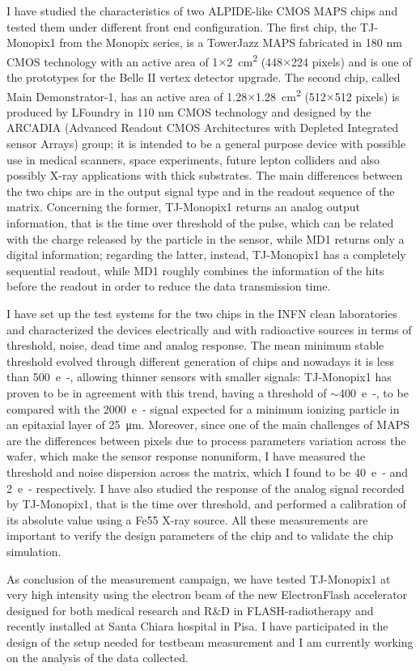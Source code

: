 I have studied the characteristics of two ALPIDE-like CMOS MAPS chips and tested them under different front end configuration. The first chip, the TJ-Monopix1 from the Monopix series, is a TowerJazz MAPS fabricated in 180 nm CMOS technology with an active area of 1$\times$2~\si{cm\squared} (448$\times$224 pixels) and is one of the prototypes for the Belle II vertex detector upgrade. The second chip, called Main Demonstrator-1, has an active area of 1.28$\times$1.28~\si{cm\squared} (512$\times$512 pixels) is produced by LFoundry in 110 nm CMOS technology and designed by the ARCADIA (Advanced Readout CMOS Architectures with Depleted Integrated sensor Arrays) group; it is intended to be a general purpose device with possible use in medical scanners, space experiments, future lepton colliders and also possibly X-ray applications with thick substrates.  
The main differences between the two chips are in the output signal type and in the readout sequence of the matrix. Concerning the former, TJ-Monopix1 returns an analog output information, that is the time over threshold of the pulse, which can be related with the charge released by the particle in the sensor, while MD1 returns only a digital information; regarding the latter, instead, TJ-Monopix1 has a completely sequential readout, while MD1 roughly combines the information of the hits before the readout in order to reduce the data transmission time.

I have set up the test systems for the two chips in the INFN clean laboratories and characterized the devices electrically and with radioactive sources in terms of threshold, noise, dead time and analog response.
The mean minimum stable threshold evolved through different generation of chips and nowadays it is less than \SI{500}{e-}, allowing thinner sensors with smaller signals: TJ-Monopix1 has proven to be in agreement with this trend, having a threshold of $\sim$\SI{400}{e-}, to be compared with the \SI{2000}{e-} signal expected for a minimum ionizing particle in an epitaxial layer of \SI{25}{\um}. 
Moreover, since one of the main challenges of MAPS are the differences between pixels due to process parameters variation across the wafer, which make the sensor response nonuniform, I have measured the threshold and noise dispersion across the matrix, which I found to be \SI{40}{e-} and \SI{2}{e-} respectively.
I have also studied the response of the analog signal recorded by TJ-Monopix1, that is the time over threshold, and performed a calibration of its absolute value using a Fe55 X-ray source.
All these measurements are important to verify the design parameters of the chip and to validate the chip simulation. 

As conclusion of the measurement campaign, we have tested TJ-Monopix1 at very high intensity using the electron beam of the new ElectronFlash accelerator designed for both medical research and R$\&$D in FLASH-radiotherapy and recently installed at Santa Chiara hospital in Pisa. I have participated in the design of the setup needed for testbeam measurement and I am currently working on the analysis of the data collected. 